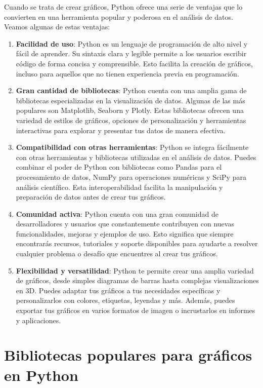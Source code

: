 \documentclass[
  a4paper,
]{article}
\begin{document}
Cuando se trata de crear gráficos, Python ofrece una serie de ventajas
que lo convierten en una herramienta popular y poderosa en el análisis
de datos. Veamos algunas de estas ventajas:

\begin{enumerate}
\def\labelenumi{\arabic{enumi}.}
\item
  \textbf{Facilidad de uso}: Python es un lenguaje de programación de
  alto nivel y fácil de aprender. Su sintaxis clara y legible permite a
  los usuarios escribir código de forma concisa y comprensible. Esto
  facilita la creación de gráficos, incluso para aquellos que no tienen
  experiencia previa en programación.
\item
  \textbf{Gran cantidad de bibliotecas}: Python cuenta con una amplia
  gama de bibliotecas especializadas en la visualización de datos.
  Algunas de las más populares son Matplotlib, Seaborn y Plotly. Estas
  bibliotecas ofrecen una variedad de estilos de gráficos, opciones de
  personalización y herramientas interactivas para explorar y presentar
  tus datos de manera efectiva.
\item
  \textbf{Compatibilidad con otras herramientas}: Python se integra
  fácilmente con otras herramientas y bibliotecas utilizadas en el
  análisis de datos. Puedes combinar el poder de Python con bibliotecas
  como Pandas para el procesamiento de datos, NumPy para operaciones
  numéricas y SciPy para análisis científico. Esta interoperabilidad
  facilita la manipulación y preparación de datos antes de crear tus
  gráficos.
\item
  \textbf{Comunidad activa}: Python cuenta con una gran comunidad de
  desarrolladores y usuarios que constantemente contribuyen con nuevas
  funcionalidades, mejoras y ejemplos de uso. Esto significa que siempre
  encontrarás recursos, tutoriales y soporte disponibles para ayudarte a
  resolver cualquier problema o desafío que encuentres al crear tus
  gráficos.
\item
  \textbf{Flexibilidad y versatilidad}: Python te permite crear una
  amplia variedad de gráficos, desde simples diagramas de barras hasta
  complejas visualizaciones en 3D. Puedes adaptar tus gráficos a tus
  necesidades específicas y personalizarlos con colores, etiquetas,
  leyendas y más. Además, puedes exportar tus gráficos en varios
  formatos de imagen o incrustarlos en informes y aplicaciones.
\end{enumerate}

\hypertarget{bibliotecas-populares-para-gruxe1ficos-en-python}{%
\section{Bibliotecas populares para gráficos en
Python}\label{bibliotecas-populares-para-gruxe1ficos-en-python}}
\end{document}
